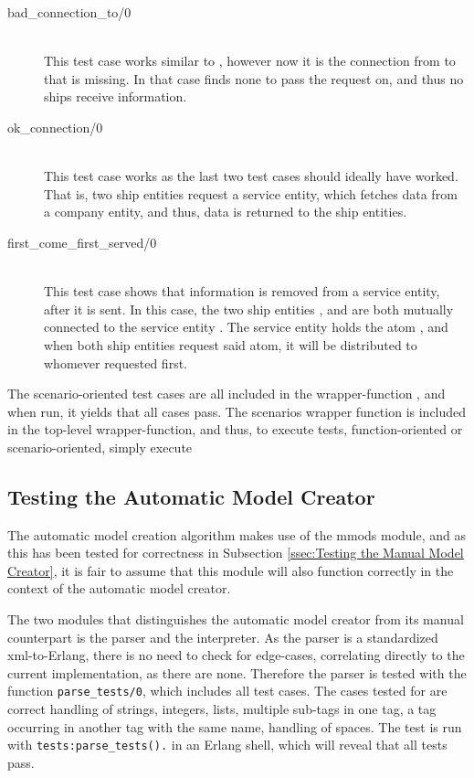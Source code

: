 \begin{description}
  \item[{bad\_connection\_to/0}]\ \\
    This test case works similar to , however now it is the connection from  to  that is missing. In that case  finds none to pass the request on, and thus no ships receive information.
  \item[{ok\_connection/0}]\ \\
    This test case works as the last two test cases should ideally have worked. That is, two ship entities request a service entity, which fetches data from a company entity, and thus, data is returned to the ship entities.
  \item[{first\_come\_first\_served/0}]\ \\
    This test case shows that information is removed from a service entity, after it is sent. In this case, the two ship entities , and  are both mutually connected to the service entity . The service entity holds the atom , and when both ship entities request said atom, it will be distributed to whomever requested first. 
\end{description}

The scenario-oriented test cases are all included in the wrapper-function , and when run, it yields that all cases pass. The scenarios wrapper function is included in the top-level wrapper-function, and thus, to execute  tests, function-oriented or scenario-oriented, simply execute 

\subsection{Testing the Automatic Model Creator}

The automatic model creation algorithm makes use of the mmods module, and as this has been tested for correctness in Subsection \ref{ssec:Testing the Manual Model Creator}, it is fair to assume that this module will also function correctly in the context of the automatic model creator. 

The two modules that distinguishes the automatic model creator from its manual counterpart is the parser and the interpreter. As the parser is a standardized xml-to-Erlang, there is no need to check for edge-cases, correlating directly to the current implementation, as there are none. Therefore the parser is tested with the function \lstinline{parse_tests/0}, which includes all test cases. The cases tested for are correct handling of strings, integers, lists, multiple sub-tags in one tag, a tag occurring in another tag with the same name, handling of spaces. The test is run with \lstinline{tests:parse_tests().} in an Erlang shell, which will reveal that all tests pass.



